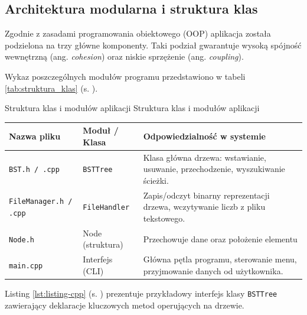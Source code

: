 \subsection{Architektura modularna i struktura klas}

\hspace{0.60cm}
Zgodnie z zasadami programowania obiektowego (OOP) aplikacja została podzielona na trzy główne komponenty. Taki podział gwarantuje wysoką spójność wewnętrzną (ang. \textit{cohesion}) oraz niskie sprzężenie (ang. \textit{coupling}).

\hspace{0.60cm}
Wykaz poszczególnych modułów programu przedstawiono w tabeli \ref{tab:struktura_klas} (s. \pageref{tab:struktura_klas}).

\begin{tabela}
	{Struktura klas i modułów aplikacji}
	{Struktura klas i modułów aplikacji}
	{
		\begin{tabular}{|l|l|p{6.5cm}|} \hline
			\textbf{Nazwa pliku} & \textbf{Moduł / Klasa} & \textbf{Odpowiedzialność w systemie} \\ \hline
			\texttt{BST.h / .cpp} & \texttt{BSTTree} & Klasa główna drzewa: wstawianie, usuwanie, przechodzenie, wyszukiwanie ścieżki. \\ \hline
			\texttt{FileManager.h / .cpp} & \texttt{FileHandler} & Zapis/odczyt binarny reprezentacji drzewa, wczytywanie liczb z pliku tekstowego. \\ \hline
			\texttt{Node.h } & Node (struktura) & Przechowuje dane oraz położenie elementu \\ \hline
			\texttt{main.cpp} & Interfejs (CLI) & Główna pętla programu, sterowanie menu, przyjmowanie danych od użytkownika. \\ \hline
		\end{tabular}
	}
	\label{tab:struktura_klas}
\end{tabela}

\hspace{0.60cm}
Listing \ref{lst:listing-cpp} (s. \pageref{lst:listing-cpp}) prezentuje przykładowy interfejs klasy \texttt{BSTTree} zawierający deklaracje kluczowych metod operujących na drzewie.

